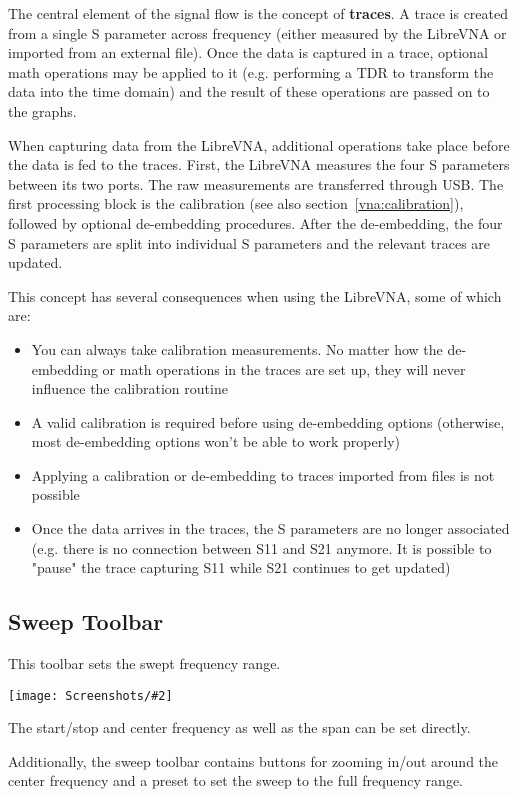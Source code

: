 \documentclass[a4paper,11pt]{article}
\newcommand{\vna}{LibreVNA}
\newcommand{\screenshot}[2]{\begin{center}
\texttt{[image: Screenshots/\#2]}
\end{center}}
\begin{document}
The central element of the signal flow is the concept of \textbf{traces}. A trace is created from a single S parameter across frequency (either measured by the \vna{} or imported from an external file). Once the data is captured in a trace, optional math operations may be applied to it (e.g. performing a TDR to transform the data into the time domain) and the result of these operations are passed on to the graphs.

When capturing data from the \vna{}, additional operations take place before the data is fed to the traces. First, the \vna{} measures the four S parameters between its two ports. The raw measurements are transferred through USB. The first processing block is the calibration (see also section~\ref{vna:calibration}), followed by optional de-embedding procedures. After the de-embedding, the four S parameters are split into individual S parameters and the relevant traces are updated.

This concept has several consequences when using the \vna{}, some of which are:
\begin{itemize}
\item You can always take calibration measurements. No matter how the de-embedding or math operations in the traces are set up, they will never influence the calibration routine
\item A valid calibration is required before using de-embedding options (otherwise, most de-embedding options won't be able to work properly)
\item Applying a calibration or de-embedding to traces imported from files is not possible
\item Once the data arrives in the traces, the S parameters are no longer associated (e.g. there is no connection between S11 and S21 anymore. It is possible to "pause" the trace capturing S11 while S21 continues to get updated)
\end{itemize}

\subsection{Sweep Toolbar}
This toolbar sets the swept frequency range.
\screenshot{1.0}{ToolbarSweep.png}
The start/stop and center frequency as well as the span can be set directly.

Additionally, the sweep toolbar contains buttons for zooming in/out around the center frequency and a preset to set the sweep to the full frequency range.
\end{document}
